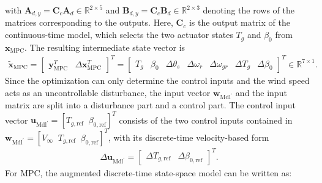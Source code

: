 with $\bm{A}_{d,y} = \bm{C}_c\bm{A}_d \in \mathbb{R}^{2 \times 5}$ and $\bm{B}_{d,y} = \bm{C}_c\bm{B}_d \in \mathbb{R}^{2 \times 3}$ denoting the rows of the matrices corresponding to the outputs. Here, $\bm{C}_c$ is the output matrix of the continuous-time model, which selects the two actuator states $T_g$ and $\beta_0$ from $\bm{x}_{\text{MPC}}$.
The resulting intermediate state vector is
\begin{align*}
    \tilde{\bm{x}}_{\text{MPC}} = \begin{bmatrix} \bm{y}_{\text{MPC}}^T & \Delta\bm{x}_{\text{MPC}}^T \end{bmatrix}^T = \begin{bmatrix} T_{g} & \beta_{0} & \Delta \theta_{s} & \Delta \omega_{r} & \Delta \omega_{gr} & \Delta T_{g} & \Delta \beta_{0} \end{bmatrix}^T \in \mathbb{R}^{7 \times 1}.
\end{align*}
%
Since the optimization can only determine the control inputs and the wind speed acts as an uncontrollable disturbance, the input vector $\bm{w}_{\text{Mdl}^\prime}$ and the input matrix are split into a disturbance part and a control part.
The control input vector $\bm{u}_{\text{Mdl}^\prime} = [T_{g,\text{ref}} \;\; \beta_{0,\text{ref}}]^T$ consists of the two control inputs contained in $\bm{w}_{\text{Mdl}^\prime} = [V_{\infty} \;\; T_{g,\text{ref}} \;\; \beta_{0,\text{ref}}]^T$, with its discrete-time velocity-based form
\begin{align} \label{eq:DeltaUinput}
    \Delta \bm{u}_{\text{Mdl}^\prime} = \begin{bmatrix} \Delta T_{g,\text{ref}} & \Delta \beta_{0,\text{ref}} \end{bmatrix}^T.
\end{align}
%
For MPC, the augmented discrete-time state-space model can be written as:
